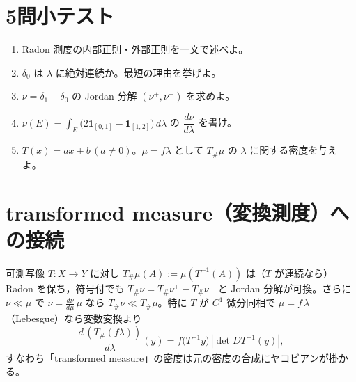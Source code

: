 \documentclass[dvipdfmx,autodetect-engine]{article}
\begin{document}
\vspace{1em}

\section*{5問小テスト}
\begin{enumerate}
  \item Radon 測度の内部正則・外部正則を一文で述べよ。
  \item \(\delta_{0}\) は \(\lambda\) に絶対連続か。最短の理由を挙げよ。
  \item \(\nu=\delta_{1}-\delta_{0}\) の Jordan 分解 \((\nu^+,\nu^-)\) を求めよ。
  \item \(\nu(E)=\int_E \big(2\mathbf{1}_{[0,1]}-\mathbf{1}_{[1,2]}\big)\,d\lambda\) の \(\dfrac{d\nu}{d\lambda}\) を書け。
  \item \(T(x)=ax+b\,(a\neq0)\)。\(\mu=f\lambda\) として \(T_\#\mu\) の \(\lambda\) に関する密度を与えよ。
\end{enumerate}

\vspace{1em}

\section*{transformed measure（変換測度）への接続}
可測写像 \(T:X\to Y\) に対し \(T_\#\mu(A):=\mu(T^{-1}(A))\) は（\(T\) が連続なら）Radon を保ち，符号付でも \(T_\#\nu=T_\#\nu^+-T_\#\nu^-\) と Jordan 分解が可換。さらに \(\nu\ll\mu\) で \(\nu=\tfrac{d\nu}{d\mu}\,\mu\) なら \(T_\#\nu\ll T_\#\mu\)。特に \(T\) が \(C^1\) 微分同相で \(\mu=f\,\lambda\)（Lebesgue）なら変数変換より
\[
\frac{d\,(T_\#(f\lambda))}{d\lambda}(y)=f\big(T^{-1}y\big)\,|\det DT^{-1}(y)|,
\]
すなわち「transformed measure」の密度は元の密度の合成にヤコビアンが掛かる。
\end{document}
